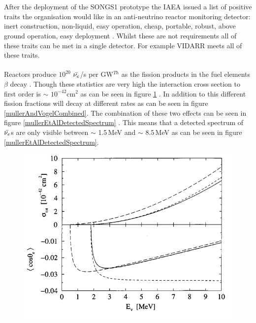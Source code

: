 \documentclass[12pt,a4paper]{article}
\begin{document}
\\\\After the deployment of the SONGS1 prototype the IAEA issued a list of positive traits the organisation would like in an anti-neutrino reactor monitoring detector: inert construction, non-liquid, easy operation, cheap, portable, robust, above ground operation, easy deployment \cite{IAEA_2008}. Whilst these are not requirements all of these traits can be met in a single detector. For example VIDARR meets all of these traits. 
\\\\Reactors produce $10^{20}$ $\Bar{\nu_e}$/s per GW$^{Th}$ as the fission products in the fuel elements $\beta$ decay \cite{Mueller_2011}. Though these statistics are very high the interaction cross section to first order is $\sim$ $10^{-42}$cm$^2$ as can be seen in figure \ref{vogelAndBeacomCrossSection} \cite{Vogel_1999}. In addition to this different fission fractions will decay at different rates as can be seen in figure \ref{mullerAndVogelCombined}. The combination of these two effects can be seen in figure \ref{mullerEtAlDetectedSpectrum} \cite{Mueller_2011}. This means that a detected spectrum of $\Bar{\nu_e}$s are only visible between $\sim$ 1.5\,MeV and $\sim$ 8.5\,MeV as can be seen in figure \ref{mullerEtAlDetectedSpectrum}. 
\begin{figure}
 \centering
 \includegraphics[width=120mm]{vogelAndBeacomCrossSection.png} %
 \label{vogelAndBeacomCrossSection}
\end{figure}
\end{document}
